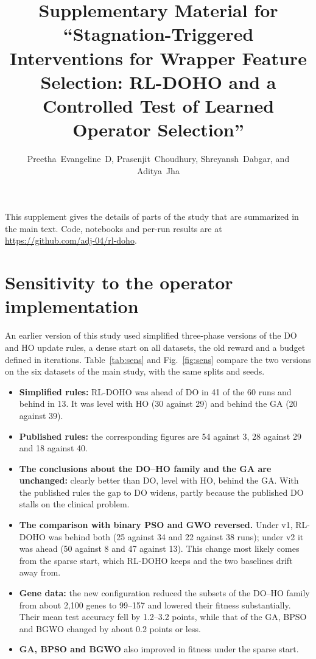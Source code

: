 \documentclass[journal]{IEEEtran}
\begin{document}
\renewcommand{\thetable}{S\arabic{table}}
\renewcommand{\thefigure}{S\arabic{figure}}
\renewcommand{\thesection}{S\arabic{section}}
\title{Supplementary Material for ``Stagnation-Triggered Interventions for Wrapper Feature Selection: RL-DOHO and a Controlled Test of Learned Operator Selection''}
\author{Preetha~Evangeline~D, Prasenjit~Choudhury, Shreyansh~Dabgar, and Aditya~Jha}
\maketitle

This supplement gives the details of parts of the study that are summarized in the main text. Code, notebooks and per-run results are at \url{https://github.com/adj-04/rl-doho}.
\section{Sensitivity to the operator implementation}
An earlier version of this study used simplified three-phase versions of the DO and HO update rules, a dense start on all datasets, the old reward and a budget defined in iterations. Table~\ref{tab:sens} and Fig.~\ref{fig:sens} compare the two versions on the six datasets of the main study, with the same splits and seeds.
\begin{itemize}
\item \textbf{Simplified rules:} RL-DOHO was ahead of DO in 41 of the 60 runs and behind in 13. It was level with HO (30 against 29) and behind the GA (20 against 39).
\item \textbf{Published rules:} the corresponding figures are 54 against 3, 28 against 29 and 18 against 40.
\item \textbf{The conclusions about the DO--HO family and the GA are unchanged:} clearly better than DO, level with HO, behind the GA. With the published rules the gap to DO widens, partly because the published DO stalls on the clinical problem.
\item \textbf{The comparison with binary PSO and GWO reversed.} Under v1, RL-DOHO was behind both (25 against 34 and 22 against 38 runs); under v2 it was ahead (50 against 8 and 47 against 13). This change most likely comes from the sparse start, which RL-DOHO keeps and the two baselines drift away from.
\item \textbf{Gene data:} the new configuration reduced the subsets of the DO--HO family from about 2,100 genes to 99--157 and lowered their fitness substantially. Their mean test accuracy fell by 1.2--3.2 points, while that of the GA, BPSO and BGWO changed by about 0.2 points or less.
\item \textbf{GA, BPSO and BGWO} also improved in fitness under the sparse start.
\end{itemize}
\end{document}
